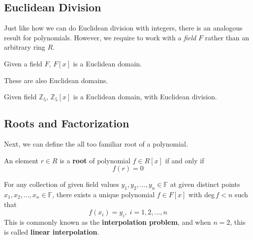 \subsection{Euclidean Division} 

  Just like how we can do Euclidean division with integers, there is an analogous result for polynomials. However, we require to work with a \textit{field} $F$ rather than an arbitrary ring $R$. 

  \begin{theorem}
    Given a field $F$, $F[x]$ is a Euclidean domain. 
  \end{theorem}

  \begin{example}
    These are also Euclidean domains. 
    
    \begin{center}
    \end{center}

    Given field $\mathbb{Z}_5$, $\mathbb{Z}_5[x]$ is a Euclidean domain, with Euclidean division.  
  \end{example} 

  \begin{definition}[GCD]
    
  \end{definition}

\subsection{Roots and Factorization}

  Next, we can define the all too familiar root of a polynomial.  

  \begin{definition}
    An element $r \in R$ is a \textbf{root} of polynomial $f \in R[x]$ if and only if 
    \begin{equation}
      f(r) = 0
    \end{equation}
  \end{definition}

  \begin{theorem}[Interpolation]
    For any collection of given field values $y_1, y_2, ..., y_n \in \mathbb{F}$ at given distinct points $x_1, x_2, ..., x_n \in \mathbb{F}$, there exists a unique polynomial $f \in F[x]$ with deg$\, f < n$ such that
    \begin{equation}
      f(x_i) = y_i, \; i = 1, 2, ..., n
    \end{equation}
    This is commonly known as the \textbf{interpolation problem}, and when $n = 2$, this is called \textbf{linear interpolation}. 
  \end{theorem} 

